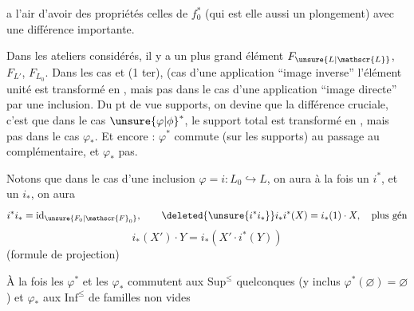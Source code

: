 
 a l'air d'avoir des propriétés   celles de $f_0^*$ (qui est elle aussi un plongement) avec une différence importante.

Dans les ateliers considérés, il y a un plus grand élément $F_{\unsure{L|\mathscr{L}}}$, $F_{L'}$, $F_{L_0}$. Dans les cas    et (1 ter),  (cas d'une application ``image inverse'' l'élément unité est transformé en , mais pas  dans le cas d'une application ``image directe'' par une inclusion. Du pt de vue supports, on devine que la différence cruciale, c'est que dans le cas ${\unsure{\varphi|\phi}}^*$, le support  total est transformé en , mais pas dans le cas $\varphi_*$. Et encore : $\varphi^*$ commute (sur les supports) au passage au complémentaire, et $\varphi_*$ pas.

Notons que dans le cas d'une inclusion $\varphi=i:L_0\hookrightarrow L$,  on aura à la fois un $i^*$, et un $i_*$, on aura
\[
i^*i_*=\mathrm{id}_{\unsure{F_0|\mathscr{F}_0}},\qquad\deleted{\unsure{i^*i_*}}i_*i^*(X)=i_*(1)\cdot X,\quad\text{plus gén}
\]
\[
i_*(X')\cdot Y=i_*(X'\cdot i^*(Y))
\]
(formule de projection)

À la fois les $\varphi^*$ et les $\varphi_*$ commutent aux $\mathrm{Sup}^{\leq}$ quelconques (y inclus $\varphi^*(\varnothing)=\varnothing$) et $\varphi_*$ aux $\mathrm{Inf}^{\leq}$ de familles non vides
